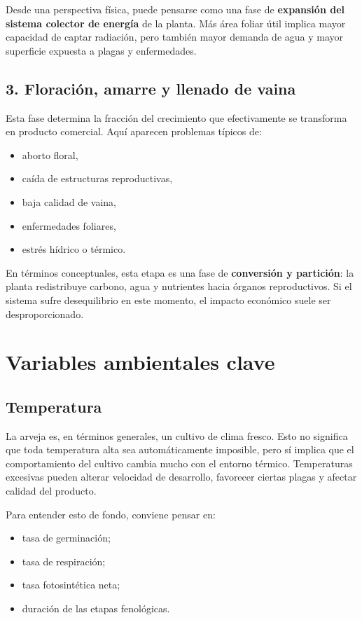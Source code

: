 \documentclass[11pt,a4paper]{article}
\begin{document}
Desde una perspectiva física, puede pensarse como una fase de \textbf{expansión del sistema colector de energía} de la planta. Más área foliar útil implica mayor capacidad de captar radiación, pero también mayor demanda de agua y mayor superficie expuesta a plagas y enfermedades.

\subsection{3. Floración, amarre y llenado de vaina}

Esta fase determina la fracción del crecimiento que efectivamente se transforma en producto comercial. Aquí aparecen problemas típicos de:
\begin{itemize}[leftmargin=1.5em]
    \item aborto floral,
    \item caída de estructuras reproductivas,
    \item baja calidad de vaina,
    \item enfermedades foliares,
    \item estrés hídrico o térmico.
\end{itemize}

En términos conceptuales, esta etapa es una fase de \textbf{conversión y partición}: la planta redistribuye carbono, agua y nutrientes hacia órganos reproductivos. Si el sistema sufre desequilibrio en este momento, el impacto económico suele ser desproporcionado.

\section{Variables ambientales clave}

\subsection{Temperatura}

La arveja es, en términos generales, un cultivo de clima fresco. Esto no significa que toda temperatura alta sea automáticamente imposible, pero sí implica que el comportamiento del cultivo cambia mucho con el entorno térmico. Temperaturas excesivas pueden alterar velocidad de desarrollo, favorecer ciertas plagas y afectar calidad del producto.

Para entender esto de fondo, conviene pensar en:
\begin{itemize}[leftmargin=1.5em]
    \item tasa de germinación;
    \item tasa de respiración;
    \item tasa fotosintética neta;
    \item duración de las etapas fenológicas.
\end{itemize}
\end{document}
